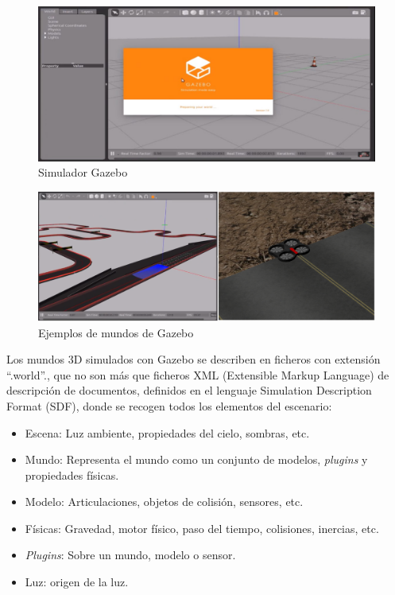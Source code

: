 \begin{figure}[H]
  \begin{center}
    \includegraphics[width=0.9\linewidth]{figures/gazebosim.jpg}
		\caption{Simulador Gazebo}
		\label{fig.gazebo}
		\end{center}
\end{figure}
\begin{figure}[H]
  \begin{center}
    \includegraphics[width=0.9\linewidth]{figures/gazeboworlds.png}
		\caption{Ejemplos de mundos de Gazebo}
		\label{fig.worlds}
		\end{center}
\end{figure}

Los mundos 3D simulados con Gazebo se describen en ficheros con extensión “.world”., que no son más que ficheros XML (Extensible Markup Language) de descripción de documentos, definidos en el lenguaje Simulation Description Format (SDF), donde se recogen todos los elementos del escenario:

\begin{itemize}
	\item Escena: Luz ambiente, propiedades del cielo, sombras, etc.
	\item Mundo: Representa el mundo como un conjunto de modelos, \textit{plugins} y propiedades físicas.
	\item Modelo: Articulaciones, objetos de colisión, sensores, etc.
	\item Físicas: Gravedad, motor físico, paso del tiempo, colisiones, inercias, etc.
	\item \textit{Plugins}: Sobre un mundo, modelo o sensor.
	\item Luz: origen de la luz.
\end{itemize}

